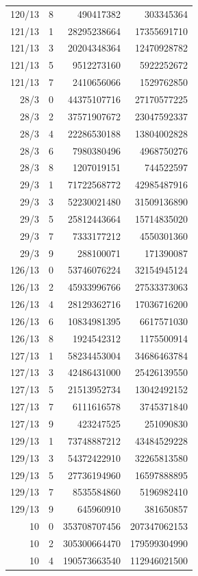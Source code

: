 \begin{longtable}{@{}rrrr@{}}
120/13 & 8 & 490417382 & 303345364\\
121/13 & 1 & 28295238664 & 17355691710\\
121/13 & 3 & 20204348364 & 12470928782\\
121/13 & 5 & 9512273160 & 5922252672\\
121/13 & 7 & 2410656066 & 1529762850\\
28/3 & 0 & 44375107716 & 27170577225\\
28/3 & 2 & 37571907672 & 23047592337\\
28/3 & 4 & 22286530188 & 13804002828\\
28/3 & 6 & 7980380496 & 4968750276\\
28/3 & 8 & 1207019151 & 744522597\\
29/3 & 1 & 71722568772 & 42985487916\\
29/3 & 3 & 52230021480 & 31509136890\\
29/3 & 5 & 25812443664 & 15714835020\\
29/3 & 7 & 7333177212 & 4550301360\\
29/3 & 9 & 288100071 & 171390087\\
126/13 & 0 & 53746076224 & 32154945124\\
126/13 & 2 & 45933996766 & 27533373063\\
126/13 & 4 & 28129362716 & 17036716200\\
126/13 & 6 & 10834981395 & 6617571030\\
126/13 & 8 & 1924542312 & 1175500914\\
127/13 & 1 & 58234453004 & 34686463784\\
127/13 & 3 & 42486431000 & 25426139550\\
127/13 & 5 & 21513952734 & 13042492152\\
127/13 & 7 & 6111616578 & 3745371840\\
127/13 & 9 & 423247525 & 251090830\\
129/13 & 1 & 73748887212 & 43484529228\\
129/13 & 3 & 54372422910 & 32265813580\\
129/13 & 5 & 27736194960 & 16597888895\\
129/13 & 7 & 8535584860 & 5196982410\\
129/13 & 9 & 645960910 & 381650857\\
10 & 0 & 353708707456 & 207347062153\\
10 & 2 & 305300664470 & 179599304990\\
10 & 4 & 190573663540 & 112946021500\\

\end{longtable}
